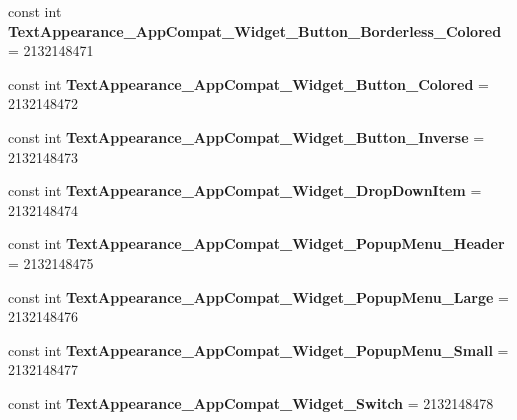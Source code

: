 \begin{DoxyCompactItemize}
const int {\bfseries Text\+Appearance\+\_\+\+App\+Compat\+\_\+\+Widget\+\_\+\+Button\+\_\+\+Borderless\+\_\+\+Colored} = 2132148471
\item 
\mbox{\label{classst_delivery_1_1_resource_1_1_style_a3c2e6529a64da0caf34cf3990a3b1cbb}} 
const int {\bfseries Text\+Appearance\+\_\+\+App\+Compat\+\_\+\+Widget\+\_\+\+Button\+\_\+\+Colored} = 2132148472
\item 
\mbox{\label{classst_delivery_1_1_resource_1_1_style_a5f95cbd68dba929752b6cf6d0441f348}} 
const int {\bfseries Text\+Appearance\+\_\+\+App\+Compat\+\_\+\+Widget\+\_\+\+Button\+\_\+\+Inverse} = 2132148473
\item 
\mbox{\label{classst_delivery_1_1_resource_1_1_style_a189786f274f61d501cd5c96866111bc4}} 
const int {\bfseries Text\+Appearance\+\_\+\+App\+Compat\+\_\+\+Widget\+\_\+\+Drop\+Down\+Item} = 2132148474
\item 
\mbox{\label{classst_delivery_1_1_resource_1_1_style_a70e5e3175fb0c1097de8ee724253f91c}} 
const int {\bfseries Text\+Appearance\+\_\+\+App\+Compat\+\_\+\+Widget\+\_\+\+Popup\+Menu\+\_\+\+Header} = 2132148475
\item 
\mbox{\label{classst_delivery_1_1_resource_1_1_style_af451539f773aa1082e819651c112ddd9}} 
const int {\bfseries Text\+Appearance\+\_\+\+App\+Compat\+\_\+\+Widget\+\_\+\+Popup\+Menu\+\_\+\+Large} = 2132148476
\item 
\mbox{\label{classst_delivery_1_1_resource_1_1_style_af5c8fc0874931cf852bb78cb6a9aacd2}} 
const int {\bfseries Text\+Appearance\+\_\+\+App\+Compat\+\_\+\+Widget\+\_\+\+Popup\+Menu\+\_\+\+Small} = 2132148477
\item 
\mbox{\label{classst_delivery_1_1_resource_1_1_style_a87819b73702e5c9c1997dae30d0dd20e}} 
const int {\bfseries Text\+Appearance\+\_\+\+App\+Compat\+\_\+\+Widget\+\_\+\+Switch} = 2132148478
\item 
\mbox{\label{classst_delivery_1_1_resource_1_1_style_a856f78ff0c35416265dd801000993996}} 

\end{DoxyCompactItemize}
